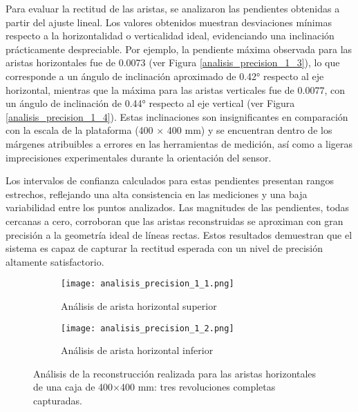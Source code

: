 Para evaluar la rectitud de las aristas, se analizaron las pendientes obtenidas a partir del ajuste lineal. Los valores obtenidos muestran desviaciones mínimas respecto a la horizontalidad o verticalidad ideal, evidenciando una inclinación prácticamente despreciable. Por ejemplo, la pendiente máxima observada para las aristas horizontales fue de 0.0073 (ver Figura \ref{analisis_precision_1_3}), lo que corresponde a un ángulo de inclinación aproximado de 0.42° respecto al eje horizontal, mientras que la máxima para las aristas verticales fue de 0.0077, con un ángulo de inclinación de 0.44° respecto al eje vertical (ver Figura \ref{analisis_precision_1_4}). Estas inclinaciones son insignificantes en comparación con la escala de la plataforma (400 $\times$ 400 mm) y se encuentran dentro de los márgenes atribuibles a errores en las herramientas de medición, así como a ligeras imprecisiones experimentales durante la orientación del sensor.

Los intervalos de confianza calculados para estas pendientes presentan rangos estrechos, reflejando una alta consistencia en las mediciones y una baja variabilidad entre los puntos analizados. Las magnitudes de las pendientes, todas cercanas a cero, corroboran que las aristas reconstruidas se aproximan con gran precisión a la geometría ideal de líneas rectas. Estos resultados demuestran que el sistema es capaz de capturar la rectitud esperada con un nivel de precisión altamente satisfactorio.

\begin{figure}[H]
	\centering
	\begin{subfigure}{1\textwidth}
		\centering
		\texttt{[image: analisis\_precision\_1\_1.png]}
		\caption{Análisis de arista horizontal superior}
		\label{analisis_precision_1_1}
	\end{subfigure}
	\vspace{1em}
	\begin{subfigure}{1\textwidth}
		\centering
		\texttt{[image: analisis\_precision\_1\_2.png]}
		\caption{Análisis de arista horizontal inferior}
		\label{analisis_precision_1_2}
	\end{subfigure}
	\caption{Análisis de la reconstrucción realizada para las aristas horizontales de una caja de 400$\times$400 mm: tres revoluciones completas capturadas.}
	\label{fig: reconstruccion_analisis_horizontal_1}
\end{figure}


